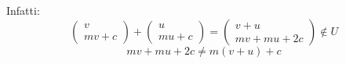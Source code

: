 \documentclass[a4paper]{article}
\theoremstyle{break}
\theoremstyle{break}
\theoremstyle{break}
\theoremstyle{break}
\begin{document}
\begin{example}
\begin{center}
    \end{center}
    Infatti:
    \[
    \begin{pmatrix} v\\mv+c \end{pmatrix} +
    \begin{pmatrix} u\\mu+c\end{pmatrix} 
    =
    \begin{pmatrix} v+u\\mv+mu+2c \end{pmatrix} \notin U
    \] 
    \[
    mv+mu+2c \neq m(v+u)+c
    \] 
  \end{example}
\end{document}
